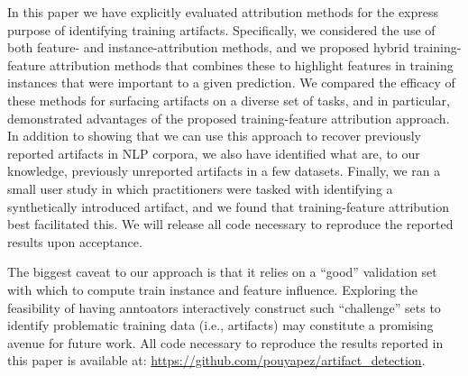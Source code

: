 \documentclass[11pt]{article}
\newcommand\para[1]{\vskip 1mm\noindent\textbf{#1}~}
\begin{document}
In this paper we have explicitly evaluated attribution methods for the express purpose of identifying training artifacts.
Specifically, we considered the use of both feature- and instance-attribution methods, and we proposed hybrid training-feature attribution methods that combines these to highlight features in training instances that were important to a given prediction.
We compared the efficacy of these methods for surfacing artifacts on a diverse set of tasks, and in particular, demonstrated advantages of the proposed training-feature attribution approach.
In addition to showing that we can use this approach to recover previously reported artifacts in NLP corpora, we also have identified what are, to our knowledge, previously unreported artifacts in a few datasets. 
Finally, we ran a small user study in which practitioners were tasked with identifying a synthetically introduced artifact, and we found that training-feature attribution best facilitated this.
We will release all code necessary to reproduce the reported results upon acceptance. 

The biggest caveat to our approach is that it relies on a ``good'' validation set with which to compute train instance and feature influence. 
Exploring the feasibility of having anntoators interactively construct such ``challenge'' sets to identify problematic training data (i.e., artifacts) may constitute a promising avenue for future work.
All code necessary to reproduce the results reported in this paper is available at: \url{https://github.com/pouyapez/artifact_detection}.

\end{document}
